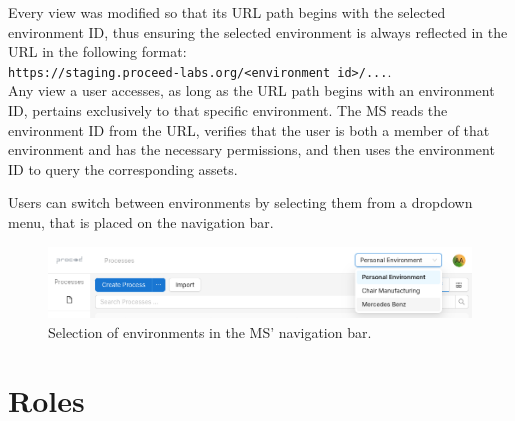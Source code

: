 
Every view was modified so that its URL path begins with the selected environment ID,
thus ensuring the selected environment is always reflected in the URL in the following format:
\\
\lstinline{https://staging.proceed-labs.org/<environment id>/...}.
\\
Any view a user accesses, as long as the URL path begins with an environment ID, pertains exclusively to that specific environment.
The MS reads the environment ID from the URL,
verifies that the user is both a member of that environment and has the necessary permissions,
and then uses the environment ID to query the corresponding assets.

%
%

Users can switch between environments by selecting them from a dropdown menu, that is
placed on the navigation bar.


\begin{figure}[H]
	\centering
	\includegraphics[scale=0.3]{images/select-environment.png}
	\caption{Selection of environments in the MS' navigation bar.}
	\vspace{-1em} %
\end{figure}

\section{Roles}

